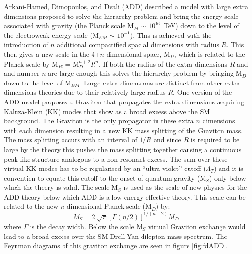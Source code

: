         Arkani-Hamed, Dimopoulos, and Dvali (ADD) \cite{ArkaniHamed:1998rs} described a model with large extra dimensions proposed to solve the hierarchy problem and bring the energy scale associated with gravity (the Planck scale M$_{Pl}$ $\sim$ $10^{16}$~TeV) down to the level of the electroweak energy scale (M$_{EM}$ $\sim$ $10^{-1}$). This is achieved with the introduction of $n$ additional compactified spacial dimensions with radius $R$. This then gives a new scale in the 4+$n$ dimensional space, M$_{D}$, which is related to the Planck scale by M$_{Pl}$ = M$_{D}^{n+2}R^{n}$. If both the radius of the extra dimensions $R$ and and number $n$ are large enough this solves the hierarchy problem by bringing M$_{D}$ down to the level of M$_{EM}$. Large extra dimensions are distinct from other extra dimensions theories due to their relatively large radius $R$.
        One version of the ADD model proposes a Graviton that propagates the extra dimensions acquiring Kaluza-Klein (KK) modes that show as a broad excess above the SM background. The Graviton is the only propagator in these extra $n$ dimensions with each dimension resulting in a new KK mass splitting of the Graviton mass. The mass splitting occurs with an interval of $1/R$ and since $R$ is required to be large by the theory this pushes the mass splitting together causing a continuous peak like structure analogous to a non-resonant excess. The sum over these virtual KK modes has to be regularised by an ``ultra violet'' cutoff ($\Lambda_{T}$) and it is convention to equate this cutoff to the onset of quantum gravity (M$_{S}$) only below which the theory is valid. The scale M$_{S}$ is used as the scale of new physics for the ADD theory below which ADD is a low energy effective theory. This scale can be related to the new $n$ dimensional Planck scale (M$_{D}$) by:
        \begin{equation}
            M_{S} = 2~\sqrt{\pi}\left[{\Gamma (n/2)}\right]^{1/(n+2)}M_{D}
            \label{eq:gravScale}
        \end{equation}
        where $\Gamma$ is the decay width. Below the scale M$_{S}$ virtual Graviton exchange would lead to a broad excess over the SM Drell-Yan dilepton mass spectrum. The Feynman diagrams of this graviton exchange are seen in figure \ref{fig:fdADD}.

